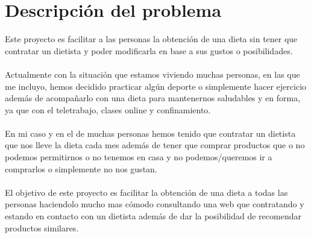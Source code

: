 \section{Descripción del problema}

Este proyecto es facilitar a las personas la obtención de una dieta sin tener que 
contratar un dietista y poder modificarla en base a sus gustos o posibilidades.
\\\\
Actualmente con la situación que estamos viviendo muchas personas, en las que me incluyo, hemos 
decidido practicar algún deporte o simplemente hacer ejercicio además de acompañarlo con una dieta 
para mantenernos saludables y en forma, ya que con el teletrabajo, clases online y confinamiento.
\\\\
En mi caso y en el de muchas personas hemos tenido que contratar un dietista que nos lleve la dieta 
cada mes además de tener que comprar productos que o no podemos permitirnos o no tenemos en casa y no 
podemos/queremos ir a comprarlos o simplemente no nos gustan.
\\\\
El objetivo de este proyecto es facilitar la obtención de una dieta a todas las personas haciendolo mucho 
mas cómodo consultando una web que contratando y estando en contacto con un dietista además de dar la posibilidad 
de recomendar productos similares.